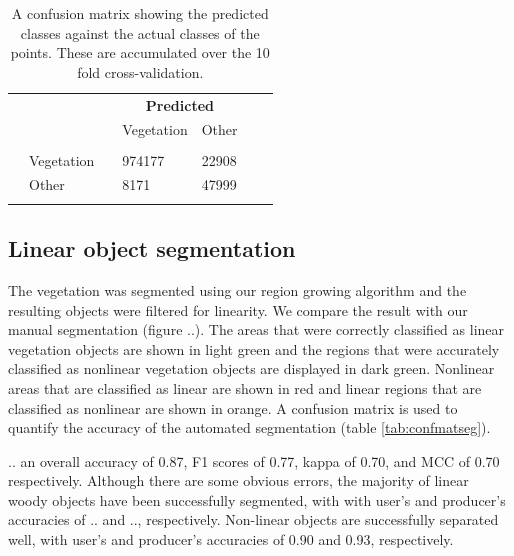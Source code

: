 \begin{table}
	\caption{A confusion matrix showing the predicted classes against the actual classes of the points. These are accumulated over the 10 fold cross-validation.}
	\label{tab:confmatclass}
	\begin{tabular}{l l l l l l l}
		\toprule
		& & & \multicolumn{2}{c}{\textbf{Predicted}} & & \\
		& & & Vegetation & Other & & \\
		\midrule
		\parbox[t]{2mm}{} & & & & & & \\
		& Vegetation & & 974177 & 22908 & & \\
		& Other & & 8171 & 47999 & & \\
		& & & & & & \\
		\bottomrule
	\end{tabular}
\end{table}

\subsection{Linear object segmentation}
The vegetation was segmented using our region growing algorithm and the resulting objects were filtered for linearity. We compare the result with our manual segmentation (figure ..). The areas that were correctly classified as linear vegetation objects are shown in light green and the regions that were accurately classified as nonlinear vegetation objects are displayed in dark green. Nonlinear areas that are classified as linear are shown in red and linear regions that are classified as nonlinear are shown in orange.  A confusion matrix is used to quantify the accuracy of the automated segmentation (table \ref{tab:confmatseg}).

.. an overall accuracy of 0.87, F1 scores of 0.77, kappa of 0.70, and MCC of 0.70 respectively. Although there are some obvious errors, the majority of linear woody objects have been successfully segmented, with with user’s and producer’s accuracies of .. and .., respectively. Non-linear objects are successfully separated well, with user’s and producer’s accuracies of 0.90 and 0.93, respectively.

